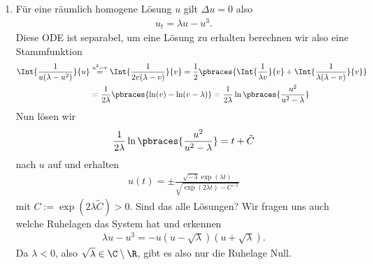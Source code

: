 \begin{solution}

\phantom{}
	\begin{enumerate}[label = (\roman*)]
		\item Für eine räumlich homogene Lösung $u$ gilt $\Delta u = 0$ also
		\begin{align*}
			u_t = \lambda u - u^3.
		\end{align*}
		Diese ODE ist separabel, um eine Lösung zu erhalten berechnen wir also eine Stammfunktion
		\begin{align*}
			\Int{\frac{1}{u(\lambda - u^2)}}{u} &\stackrel{u^2 = v}{=} \Int{\frac{1}{2 v(\lambda - v)}}{v} = \frac{1}{2} \pbraces{\Int{\frac{1}{\lambda v}}{v} + \Int{\frac{1}{\lambda (\lambda - v)}}{v}} \\
			 &= \frac{1}{2\lambda} \pbraces{\ln(v) - \ln(v - \lambda)} = \frac{1}{2 \lambda} \ln\pbraces{\frac{u^2}{u^2 - \lambda}}
		\end{align*}
		Nun lösen wir
		\begin{align*}
			\frac{1}{2 \lambda} \ln\pbraces{\frac{u^2}{u^2 - \lambda}} = t + \tilde{C}
		\end{align*}
		nach $u$ auf und erhalten
		\begin{align*}
			u(t) = \pm \frac{\sqrt{- \lambda} \exp(\lambda t)}{\sqrt{\exp(2\lambda t) - C^{-1}}}
		\end{align*}
		mit $C := \exp (2 \lambda \tilde{C}) > 0$. Sind das alle Lösungen? \newline
		Wir fragen uns auch welche Ruhelagen das System hat und erkennen
		\begin{align*}
			\lambda u - u^3 = - u (u - \sqrt{\lambda}) (u + \sqrt{\lambda}).
		\end{align*}
		Da $\lambda < 0$, also $\sqrt{\lambda} \in \C \setminus \R$, gibt es also nur die Ruhelage Null.
		


\end{enumerate}
\end{solution}
